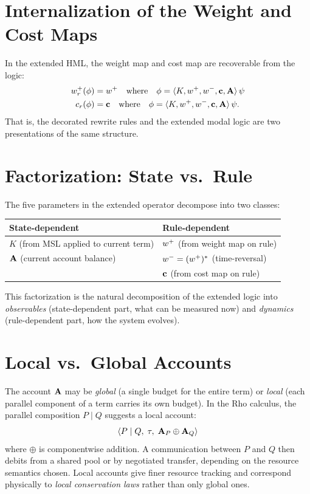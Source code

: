 \section{Internalization of the Weight and Cost Maps}

\begin{proposition}
In the extended HML, the weight map and cost map are recoverable from the
logic:
\begin{align}
  w^{+}_r(\phi) &= w^{+} \quad\text{where}\quad
    \phi = \langle K, w^{+}, w^{-}, \mathbf{c}, \mathbf{A} \rangle\,\psi \\
  c_r(\phi) &= \mathbf{c} \quad\text{where}\quad
    \phi = \langle K, w^{+}, w^{-}, \mathbf{c}, \mathbf{A} \rangle\,\psi.
\end{align}
That is, the decorated rewrite rules and the extended modal logic are two
presentations of the same structure.
\end{proposition}

\section{Factorization: State vs.\ Rule}

The five parameters in the extended operator decompose into two classes:

\begin{center}
\begin{tabular}{ll}
\toprule
\textbf{State-dependent} & \textbf{Rule-dependent} \\
\midrule
$K$ (from MSL applied to current term) & $w^{+}$ (from weight map on rule) \\
$\mathbf{A}$ (current account balance) & $w^{-} = (w^{+})^*$ (time-reversal) \\
 & $\mathbf{c}$ (from cost map on rule) \\
\bottomrule
\end{tabular}
\end{center}

This factorization is the natural decomposition of the extended logic into
\emph{observables} (state-dependent part, what can be measured now) and
\emph{dynamics} (rule-dependent part, how the system evolves).

\section{Local vs.\ Global Accounts}

The account $\mathbf{A}$ may be \emph{global} (a single budget for the entire
term) or \emph{local} (each parallel component of a term carries its own
budget).  In the Rho calculus, the parallel composition $P \mid Q$ suggests
a local account:
\[
  \langle P \mid Q,\; \tau,\; \mathbf{A}_P \oplus \mathbf{A}_Q \rangle
\]
where $\oplus$ is componentwise addition.  A communication between $P$ and $Q$
then debits from a shared pool or by negotiated transfer, depending on the
resource semantics chosen.  Local accounts give finer resource tracking and
correspond physically to \emph{local conservation laws} rather than only
global ones.

